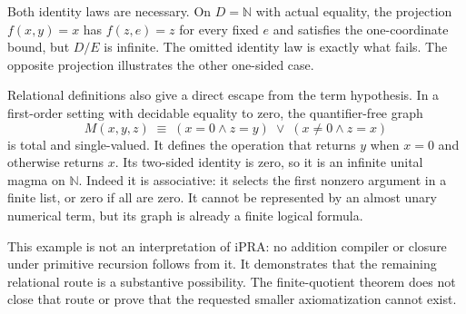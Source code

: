 Both identity laws are necessary. On $D=\mathbb N$ with actual
equality, the projection $f(x,y)=x$ has $f(z,e)=z$ for every fixed
$e$ and satisfies the one-coordinate bound, but $D/E$ is infinite.
The omitted identity law is exactly what fails. The opposite
projection illustrates the other one-sided case.

Relational definitions also give a direct escape from the term
hypothesis. In a first-order setting with decidable equality to
zero, the quantifier-free graph
\[
 M(x,y,z)\;\equiv\;
 (x=0\land z=y)\;\lor\;
 (x\ne0\land z=x)
\]
is total and single-valued. It defines the operation that returns
$y$ when $x=0$ and otherwise returns $x$. Its two-sided identity is
zero, so it is an infinite unital magma on $\mathbb N$. Indeed it is
associative: it selects the first nonzero argument in a finite list,
or zero if all are zero. It cannot be represented by an almost unary
numerical term, but its graph is already a finite logical formula.

This example is not an interpretation of iPRA: no addition compiler
or closure under primitive recursion follows from it. It demonstrates
that the remaining relational route is a substantive possibility.
The finite-quotient theorem does not close that route or prove that
the requested smaller axiomatization cannot exist.
